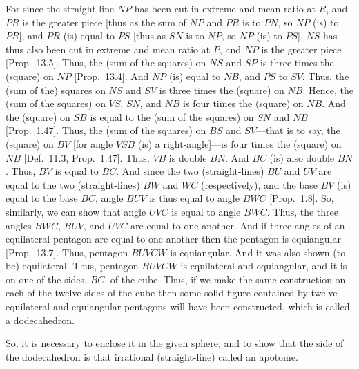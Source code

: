 For since the straight-line $NP$ has been cut in extreme and mean ratio at
$R$, and $PR$ is the greater piece [thus as the sum of
$NP$ and $PR$ is to $PN$, so $NP$ (is) to $PR$], and $PR$
(is) equal to $PS$ [thus as $SN$ is to $NP$, so $NP$ (is) to $PS$], 
$NS$ has thus also been cut in extreme and mean ratio at $P$, and $NP$
is the greater piece [Prop.~13.5]. Thus, the (sum of the squares) on
$NS$ and $SP$ is three times the (square) on $NP$ [Prop.~13.4].
And $NP$ (is) equal to $NB$, and $PS$ to $SV$. Thus, the (sum of the)
squares on  $NS$ and $SV$ is three times the (square) on $NB$.
Hence, the (sum of the squares) on $VS$, $SN$, and $NB$
is four times the (square) on $NB$. And the (square) on $SB$
is equal to the (sum of the squares) on
$SN$ and $NB$  [Prop.~1.47].
Thus, the (sum of the squares) on $BS$ and $SV$---that is to say, 
the (square) on $BV$ [for angle $VSB$ (is) a right-angle]---is
four times the (square) on $NB$ [Def.~11.3, Prop.~1.47].
Thus, $VB$ is double $BN$. And $BC$ (is) also double $BN$.
Thus, $BV$ is equal to $BC$. And since the two (straight-lines)
$BU$ and $UV$ are equal to the two (straight-lines)
$BW$ and $WC$ (respectively), and the base $BV$ (is) equal to
the base $BC$, angle $BUV$ is thus equal to angle $BWC$ [Prop.~1.8].
So, similarly, we can show that angle $UVC$ is equal to angle
$BWC$.  Thus, the three angles
$BWC$, $BUV$, and $UVC$ are equal to one another.
And if three angles of an equilateral pentagon are equal to one another
then the pentagon is equiangular [Prop.~13.7].  Thus, pentagon
$BUVCW$ is equiangular. And it was also shown (to be)
equilateral. Thus, pentagon $BUVCW$ is equilateral and equiangular,
and it is on one of the sides, $BC$, of the cube. Thus, if we make the
same construction on each of the twelve sides of the cube then some solid
figure contained by twelve equilateral and equiangular pentagons 
will have been constructed,  which is called a dodecahedron.

So, it is necessary to enclose it in the given sphere, and to show that the
side of the dodecahedron is that irrational (straight-line) called an apotome.

